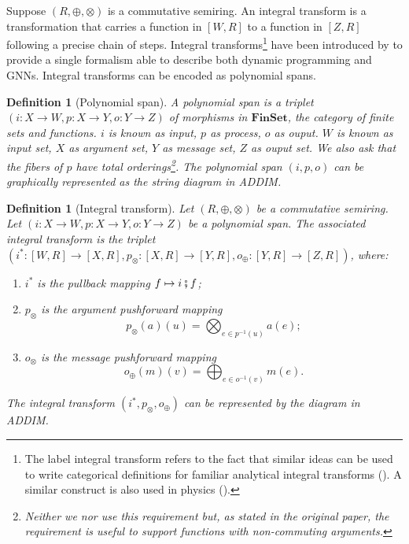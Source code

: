 \documentclass[11pt,a4paper,openright,twoside]{report}
\newcounter{mycounter}
\theoremstyle{plain}
\newtheorem{definition}[mycounter]{Definition}
\theoremstyle{definition}
\begin{document}
Suppose $(R, \oplus, \otimes)$ is a commutative semiring. An integral transform is a transformation that carries a function in $[W,R]$ to a function in $[Z,R]$ following a precise chain of steps. Integral transforms\footnote{The label integral transform refers to the fact that similar ideas can be used to write categorical definitions for familiar analytical integral transforms (\cite{golem_ph_utexas_edu}). A similar construct is also used in physics (\cite{eastwood1980cohomology}).} have been introduced by \cite{dudzik2022graph} to provide a single formalism able to describe both dynamic programming and GNNs. Integral transforms can be encoded as polynomial spans.

\begin{definition}[Polynomial span]
  A polynomial span is a triplet $(i: X \to W,p: X \to Y,o: Y \to Z)$ of morphisms in $\mathbf{FinSet}$, the category of finite sets and functions. $i$ is known as input, $p$ as process, $o$ as ouput. $W$ is known as input set, $X$ as argument set, $Y$ as message set, $Z$ as ouput set. We also ask that the fibers of $p$ have total orderings\footnote{Neither we nor \cite{dudzik2022graph} use this requirement but, as stated in the original paper, the requirement is useful to support functions with non-commuting arguments.}. The polynomial span $(i,p,o)$ can be graphically represented as the string diagram in ADDIM.
\end{definition}

\begin{definition}[Integral transform]
  Let $(R, \oplus, \otimes)$ be a commutative semiring. Let $(i: X \to W,p: X \to Y,o: Y \to Z)$ be a polynomial span. The associated integral transform is the triplet $(i^*: [W,R] \to [X,R], p_{\otimes}: [X,R] \to [Y,R], o_{\oplus}: [Y,R] \to [Z,R])$, where:
  \begin{enumerate}
    \item $i^*$ is the pullback mapping $f \mapsto i \fatsemi f$;
    \item $p_{\otimes}$ is the argument pushforward mapping 
    \[p_{\otimes}(a)(u) = \bigotimes_{e \in p^{-1}(u)}a(e);\]
    \item $o_{\otimes}$ is the message pushforward mapping 
    \[o_{\oplus}(m)(v) = \bigoplus_{e \in o^{-1}(v)}m(e).\]
  \end{enumerate}
  The integral transform $(i^*, p_{\otimes}, o_{\oplus})$ can be represented by the diagram in ADDIM.
\end{definition}
\end{document}
